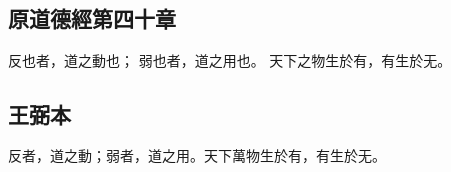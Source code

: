 ﻿%
%

\chapter{~}

\section{原道德經第四十章}

\begin{withgezhu}

\zhsong


\colorbox{adding-color}{反也者}，道之動也；
\colorbox{missing-color}{弱也}者，道之用也。
天\colorbox{adding-color}{下之物生於有，有生\textcolor{wangbi-color}{於}无}。

\end{withgezhu}

\section{王弼本}

\begin{withgezhu}

\zhsong

反者，道之動；弱者，道之用。天下萬物生於有，有生於无。

\end{withgezhu}
